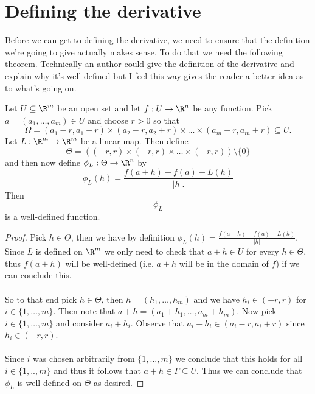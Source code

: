 		\section{Defining the derivative}
		
		
		
		Before we can get to defining the derivative, we need to ensure that the definition we're going to give actually makes sense. To do that we need the following theorem. Technically an author could give the definition of the derivative and explain why it's well-defined but I feel this way gives the reader a better idea as to what's going on.
		
		\begin{theorem}
			Let $U \subseteq \R^m$ be an open set and let $f : U \to \R^n$ be any function. Pick $a = (a_1, \dots, a_m) \in U$ and choose $r > 0$ so that $$\Omega = \left(a_1 - r, a_1 + r \right) \times \left(a_2 - r, a_2 + r \right) \times \dots \times \left(a_m - r, a_m + r \right)   \subseteq U.$$ Let $L : \R^m \to \R^m$ be a linear map. Then define $$\Theta = \left((-r, r) \times (-r, r) \times \dots \times (-r, r) \right) \setminus \{0\}$$  and then now define $\phi_L : \Theta \to \R^n$ by $$\phi_L(h) = \frac{f(a+h) - f(a) - L(h)}{|h|.}$$ Then $$\phi_L$$ is a well-defined function.
		\end{theorem}
		
		\begin{proof}
			Pick $h \in \Theta$, then we have by definition $\phi_L(h) = \frac{f(a+h) - f(a) - L(h)}{|h|}$. Since $L$ is defined on $\R^m$ we only need to check that $a + h \in U$ for every $h \in \Theta$, thus $f(a+h)$ will be well-defined (i.e. $a+h$ will be in the domain of $f$) if we can conclude this.
			\\ \\
			So to that end pick $h \in \Theta$, then $h = (h_1, \dots, h_m)$ and we have  $h_i \in (-r, r)$ for $i \in \{1, \dots, m\}$. Then note that $a+h = (a_1 + h_1, \dots, a_m + h_m)$. Now pick $i \in \{1, \dots, m\}$ and consider $a_i + h_i$. Observe that $a_i + h_i \in (a_i -r, a_i + r)$ since $h_i \in (-r, r)$. \\ \\ Since $i$ was chosen arbitrarily from $\{1, ..., m\}$ we conclude that this holds for all $i \in \{1, .., m\}$ and thus it follows that $a+h \in \Gamma \subseteq U$. Thus we can conclude that $\phi_L$ is well defined on $\Theta$ as desired.
		\end{proof}
		
